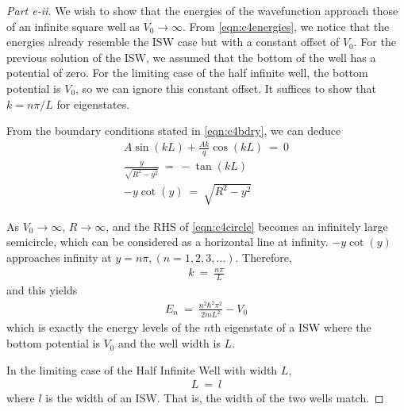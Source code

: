 \documentclass{article}
\numberwithin{equation}{section}
\begin{document}
\begin{proof}
    [Part e-ii] We wish to show that the energies of the 
    wavefunction approach those of an infinite square well as $V_0 \rightarrow \infty$. 
    From \eqref{eqn:c4energies}, we notice that the energies 
    already resemble the ISW case but with a constant offset of $V_0$. 
    For the previous solution of the ISW, we assumed that the bottom 
    of the well has a potential of zero. For the limiting case 
    of the half infinite well, the bottom potential is $V_0$, so 
    we can ignore this constant offset. It suffices to show that 
    $k = n\pi/L$ for eigenstates. 

    From the boundary conditions stated in \eqref{eqn:c4bdry}, 
    we can deduce 
    \begin{align}
        A\sin(kL) + \frac {Ak} q \cos(kL) \ = \ 0 \\ 
        \frac y {\sqrt{R^2 - y^2}} \ = \ -\tan(kL) \\\label{eqn:c4circle}
        -y \cot(y) \ = \ \sqrt{R^2 - y^2}
    \end{align}

    As $V_0\rightarrow \infty$, $R \rightarrow \infty$, and 
    the RHS of \eqref{eqn:c4circle} becomes an infinitely 
    large semicircle, which can be considered as a horizontal 
    line at infinity. $-y\cot(y)$ approaches infinity at $y = n\pi, (n = 1, 2, 3, \dots)$. 
    Therefore, \begin{align}
        \boxed{k \ = \ \frac{n\pi} L}
    \end{align}
    and this yields
    \begin{align}
        E_n \ = \ \frac{n^2 \hbar^2 \pi^2}{2m L^2} - V_0
    \end{align}
    which is exactly the energy levels of the $n$th eigenstate 
    of a ISW where the bottom potential is $V_0$ and the well width is $L$. 

    In the limiting case of the Half Infinite Well with width $L$, 
    \begin{align}
        \boxed{L \ = \ l}
    \end{align}
    where $l$ is the width of an ISW. That is, the width of 
    the two wells match. 
\end{proof}
\end{document}
